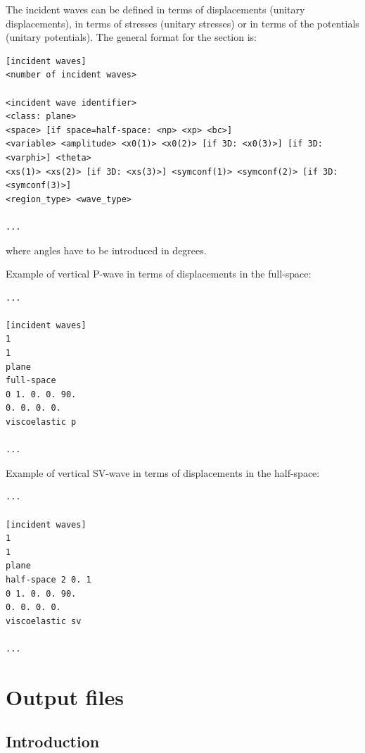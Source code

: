\documentclass[a4paper,fleqn]{book}
\begin{document}
The incident waves can be defined in terms of displacements (unitary displacements), in terms of stresses (unitary stresses) or in terms of the potentials (unitary potentials). The general format for the section is:
\begin{Verbatim}[frame=single, fontsize=\small, label={general format of section [incident waves]}]
[incident waves]
<number of incident waves>

<incident wave identifier>
<class: plane>
<space> [if space=half-space: <np> <xp> <bc>]
<variable> <amplitude> <x0(1)> <x0(2)> [if 3D: <x0(3)>] [if 3D: <varphi>] <theta>
<xs(1)> <xs(2)> [if 3D: <xs(3)>] <symconf(1)> <symconf(2)> [if 3D: <symconf(3)>]
<region_type> <wave_type>

...
\end{Verbatim} 
where angles have to be introduced in degrees.

Example of vertical P-wave in terms of displacements in the full-space: 
\begin{Verbatim}[frame=single, fontsize=\small, label={input.dat}]
...

[incident waves]
1
1
plane
full-space
0 1. 0. 0. 90.
0. 0. 0. 0.
viscoelastic p

...
\end{Verbatim} 
Example of vertical SV-wave in terms of displacements in the half-space: 
\begin{Verbatim}[frame=single, fontsize=\small, label={input.dat}]
...

[incident waves]
1
1
plane
half-space 2 0. 1
0 1. 0. 0. 90.
0. 0. 0. 0.
viscoelastic sv

...
\end{Verbatim}


\chapter{Output files}

\label{ch:output_files}

\section{Introduction}
\end{document}

